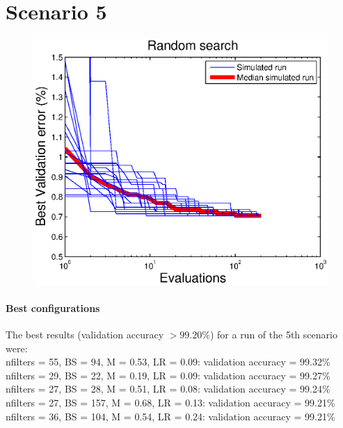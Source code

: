 \documentclass{article}
\begin{document}
    
    
\section*{Scenario 5}
    
    \begin{figure}[!htb]
        \centering
        \includegraphics[width=\textwidth]{figures/sc5}
    \end{figure}
    
    \paragraph{Best configurations}
        The best results (validation accuracy $> 99.20\%$) for a run of the 5th scenario were:
        \vspace{10px}\\
        nfilters = 55, BS = 94, M = 0.53, LR = 0.09: validation accuracy = 99.32\% \\
        nfilters = 29, BS = 22, M = 0.19, LR = 0.09: validation accuracy = 99.27\% \\
        nfilters = 27, BS = 28,	M = 0.51, LR = 0.08: validation accuracy = 99.24\% \\
        nfilters = 27, BS = 157, M = 0.68, LR = 0.13: validation accuracy = 99.21\% \\
        nfilters = 36, BS = 104, M = 0.54, LR = 0.24: validation accuracy = 99.21\% \\
        
\end{document}
